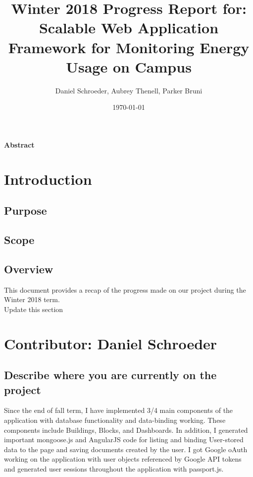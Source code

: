 \documentclass[letterpaper,10pt,serif,draftclsnofoot,onecolumn,compsoc,titlepage]{IEEEtran}
\title{Winter 2018 Progress Report for: \linebreak Scalable Web Application Framework for Monitoring Energy Usage on Campus}
\author{Daniel Schroeder, Aubrey Thenell, Parker Bruni}
\date{\today}
\begin{document}
 \maketitle
 \vspace{2cm}
 \begin{center}
 \noindent \textbf{Abstract} \\
			 \indent 
 \end{center}         
 
 \newpage
\tableofcontents
\newpage

\section{Introduction}
\subsection{Purpose}
\subsection{Scope}
\subsection{Overview}
This document provides a recap of the progress made on our project during the Winter 2018 term. \\
Update this section \\ 
\section{Contributor: Daniel Schroeder} 
\subsection{Describe where you are currently on the project}
Since the end of fall term, I have implemented 3/4 main components of the application with database functionality and data-binding working. These components include Buildings, Blocks, and Dashboards. In addition, I generated important mongoose.js and AngularJS code for listing and binding User-stored data to the page and saving documents created by the user. I got Google oAuth working on the application with user objects referenced by Google API tokens and generated user sessions throughout the application with passport.js. 
\end{document}

